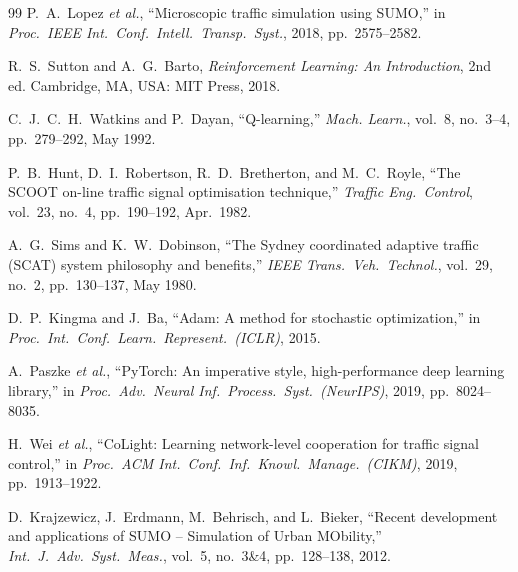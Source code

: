 \documentclass[lettersize,journal]{IEEEtran}
\begin{document}
\begin{thebibliography}{99}
P.~A.~Lopez \textit{et al.},
``Microscopic traffic simulation using SUMO,''
in \textit{Proc.\ IEEE Int.\ Conf.\ Intell.\ Transp.\ Syst.},
2018, pp.~2575--2582.

R.~S.~Sutton and A.~G.~Barto,
\textit{Reinforcement Learning: An Introduction}, 2nd ed.
Cambridge, MA, USA: MIT Press, 2018.

C.~J.~C.~H.~Watkins and P.~Dayan,
``Q-learning,''
\textit{Mach. Learn.}, vol.~8, no.~3--4, pp.~279--292, May 1992.

P.~B.~Hunt, D.~I.~Robertson, R.~D.~Bretherton, and M.~C.~Royle,
``The SCOOT on-line traffic signal optimisation technique,''
\textit{Traffic Eng.\ Control}, vol.~23, no.~4, pp.~190--192, Apr.\ 1982.

A.~G.~Sims and K.~W.~Dobinson,
``The Sydney coordinated adaptive traffic (SCAT) system philosophy and
benefits,''
\textit{IEEE Trans.\ Veh.\ Technol.}, vol.~29, no.~2, pp.~130--137,
May 1980.

D.~P.~Kingma and J.~Ba,
``Adam: A method for stochastic optimization,''
in \textit{Proc.\ Int.\ Conf.\ Learn.\ Represent.\ (ICLR)}, 2015.

A.~Paszke \textit{et al.},
``PyTorch: An imperative style, high-performance deep learning library,''
in \textit{Proc.\ Adv.\ Neural Inf.\ Process.\ Syst.\ (NeurIPS)}, 2019,
pp.~8024--8035.

H.~Wei \textit{et al.},
``CoLight: Learning network-level cooperation for traffic signal
control,''
in \textit{Proc.\ ACM Int.\ Conf.\ Inf.\ Knowl.\ Manage.\ (CIKM)}, 2019,
pp.~1913--1922.

D.~Krajzewicz, J.~Erdmann, M.~Behrisch, and L.~Bieker,
``Recent development and applications of SUMO -- Simulation of Urban
MObility,''
\textit{Int.\ J.\ Adv.\ Syst.\ Meas.}, vol.~5, no.~3\&4, pp.~128--138,
2012.

\end{thebibliography}

\newpage
\raggedbottom
\end{document}
